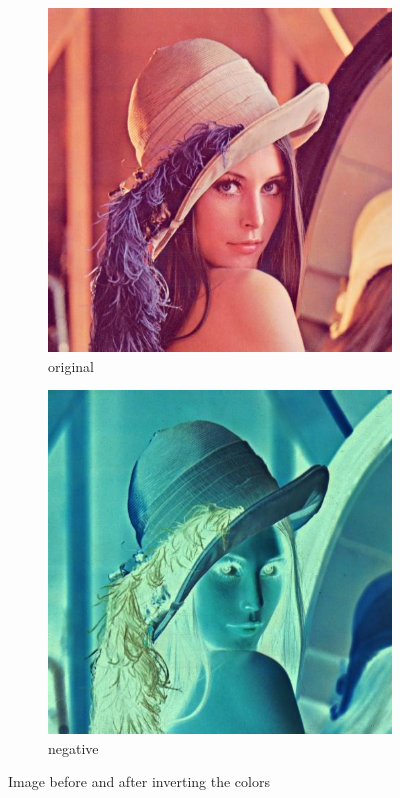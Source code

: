 \documentclass[12pt]{article}
\theoremstyle{definition}
\newcommand{\subfiguresize}{.3\textwidth}
\begin{document}
\begin{figure}[H]\centering
    \begin{subfigure}[t]{\subfiguresize}\centering
        \includegraphics[width=\textwidth]{lenac.png}
        \caption{original}
    \end{subfigure}
    \hspace{.05\textwidth}
    \begin{subfigure}[t]{\subfiguresize}\centering
        \includegraphics[width=\textwidth]{lenac_negative.png}
        \caption{negative}
    \end{subfigure}
    \caption{Image before and after inverting the colors}
\end{figure}
\end{document}
